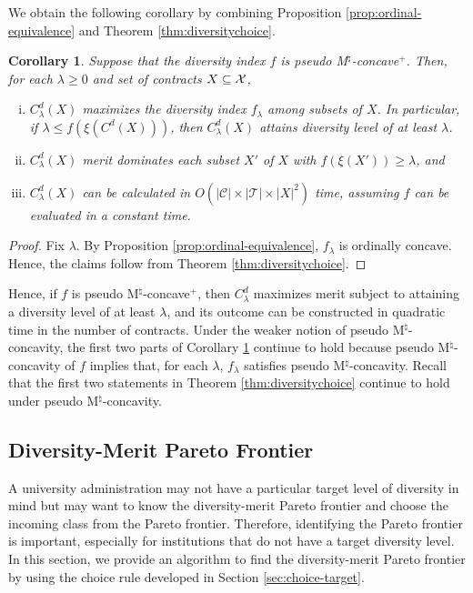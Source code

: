 \documentclass[12pt]{amsart}
\newtheorem{corollary}{Corollary}
\theoremstyle{remark}
\begin{document}
We obtain the following corollary by combining Proposition \ref{prop:ordinal-equivalence} and Theorem \ref{thm:diversitychoice}.
\begin{corollary}\label{corollary:diversitychoice}
Suppose that the diversity index $f$ is pseudo M$^\natural$-concave$^+$. Then, for each $\lambda\geq 0$ and  set of contracts $X\subseteq \mathcal{X}$,
\begin{enumerate}[(i)]
\item $C^d_\lambda(X)$ maximizes the diversity index $f_\lambda$ among subsets of $X$. In particular, if $\lambda\leq f(\xi(C^d(X)))$, then $C^d_\lambda(X)$ attains diversity level of at least $\lambda$.
\item $C^d_\lambda(X)$ merit dominates each subset $X'$ of $X$ with $f(\xi(X'))\geq \lambda$, and
\item $C^d_\lambda(X)$ can be calculated in $O(|\mathcal{C}| \times |\mathcal{T}| \times |X|^2)$ time, assuming $f$ can be evaluated in a constant time.
\end{enumerate}
\end{corollary}
\begin{proof}
Fix $\lambda$. By Proposition \ref{prop:ordinal-equivalence}, $f_\lambda$ is ordinally concave. Hence, the claims follow from Theorem \ref{thm:diversitychoice}.
\end{proof}
Hence, if $f$ is pseudo M$^\natural$-concave$^+$, then $C^d_{\lambda}$ maximizes merit subject to attaining a diversity level of at least $\lambda$, and its outcome can be constructed in quadratic time in the number of contracts. Under the weaker notion of
pseudo M$^\natural$-concavity, the first two parts of Corollary \ref{corollary:diversitychoice} continue to hold because pseudo
M$^\natural$-concavity of $f$ implies that, for each $\lambda$, $f_{\lambda}$ satisfies pseudo M$^\natural$-concavity.
Recall that the first two statements in Theorem \ref{thm:diversitychoice} continue to
hold under pseudo M$^\natural$-concavity.

\subsection{Diversity-Merit Pareto Frontier}
A university administration may not have a particular target level of diversity in
mind but may want to know the diversity-merit Pareto frontier and choose the incoming class from the Pareto frontier. Therefore, identifying the Pareto frontier is important, especially for institutions that do not have a target diversity level. In
this section, we provide an algorithm to find the diversity-merit Pareto frontier
by using the choice rule developed in Section \ref{sec:choice-target}.
\end{document}
